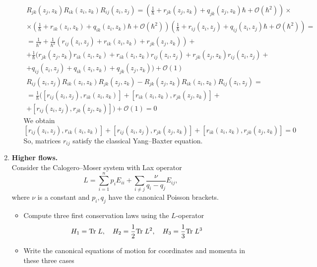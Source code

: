\documentclass[12pt]{article}
\theoremstyle{definition}
\begin{document}
\begin{enumerate}
\begin{itemize}
\begin{multline}
            R_{jk}(z_j, z_k)R_{ik}(z_i, z_k)R_{ij}(z_i, z_j)=\left(\frac{1}{\hbar}+r_{jk}(z_j,z_k)+q_{jk}(z_j,z_k)\hbar+\mathcal{O}(\hbar^2)\right)\times\\\times\left(\frac{1}{\hbar}+r_{ik}(z_i, z_k)+q_{ik}(z_i,z_k)\hbar+\mathcal{O}(\hbar^2)\right)\left(\frac{1}{\hbar}+r_{ij}(z_i, z_j)+q_{ij}(z_i,z_j)\hbar+\mathcal{O}(\hbar^2)\right)=\\=\frac{1}{\hbar^3}+\frac{1}{\hbar^2}\left(r_{ij}(z_i,z_j)+r_{ik}(z_i,z_k)+r_{jk}(z_j,z_k)\right)+\\+\frac{1}{\hbar}(r_{jk}(z_j,z_k)r_{ik}(z_i,z_k)+r_{ik}(z_i,z_k)r_{ij}(z_i,z_j)+r_{jk}(z_j,z_k)r_{ij}(z_i,z_j)+\\+q_{ij}(z_i,z_j)+q_{ik}(z_i,z_k)+q_{jk}(z_j,z_k))+\mathcal{O}(1)
        \end{multline}
        \begin{multline}
            R_{ij}(z_i,z_j)R_{ik}(z_i, z_k)R_{jk}(z_j,z_k)-R_{jk} (z_j, z_k)R_{ik}(z_i,z_k)R_{ij}(z_i,z_j)=\\=\frac{1}{\hbar}([r_{ij}(z_i,z_j),r_{ik}(z_i,z_k)]+[r_{ik}(z_i,z_k),r_{jk}(z_j,z_k)]+\\+[r_{ij}(z_i,z_j),r_{jk}(z_j,z_k)])+\mathcal{O}(1)=0
        \end{multline}
        We obtain
        \begin{equation}
            \boxed{[r_{ij}(z_i, z_j), r_{ik}(z_i, z_k)] + [r_{ij}(z_i, z_j), r_{jk}(z_j, z_k)] + [r_{ik}(z_i, z_k), r_{jk}(z_j, z_k)] = 0}
        \end{equation}
        So, matrices $r_{ij}$ satisfy the classical Yang–Baxter equation.
    \end{itemize}
    \item \textbf{Higher flows.}\\
    Consider the Calogero–Moser system with Lax operator
    \begin{equation}
        L = \sum_{i=1}^n p_iE_{ii} +\sum_{i\neq j}\frac{\nu}{q_i-q_j}E_{ij},
    \end{equation}
    where $\nu$ is a constant and $p_i, q_j$ have the canonical Poisson brackets.
    \begin{itemize}
        \item Compute three first conservation laws using the $L$-operator
        \begin{equation}
            H_1 = \text{Tr\;}L,\quad H_2 = \frac{1}{2}\text{Tr\;}L^2,\quad H_3 = \frac{1}{3}\text{Tr\;}L^3
        \end{equation}
        \item Write the canonical equations of motion for coordinates and momenta in these three cases

\end{itemize}
\end{enumerate}
\end{document}
